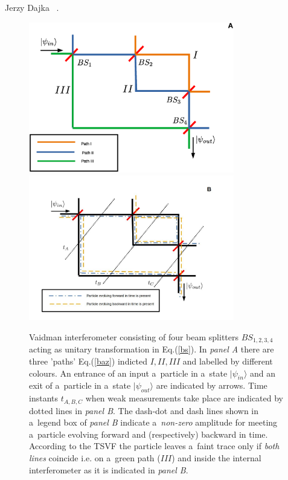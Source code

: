 \begin{artengenv}{Jerzy Dajka}
~\parencite{PhysRevA.95.032110,PhysRevA.97.046103,PhysRevA.97.046102,vaid_trans,lady}. 
\begin{figure}
\begin{center}
 \includegraphics[width=0.8\textwidth]{ART_dajka/vaid1a.eps}\\%
 \includegraphics[width=0.8\textwidth]{ART_dajka/vaid1b.jpg}%
\end{center}
 \caption{Vaidman  interferometer consisting of four beam splitters $BS_{1,2,3,4}$ acting as unitary transformation in Eq.(\ref{bs}). In  {\it panel A} there are  three 'paths' Eq.(\ref{baz}) indicted  $I,II,III$ and labelled by different colours. An entrance of an input a~particle in a~state $|\psi_{in}\rangle$ and an exit of a~particle in a~state $|\psi_{out}\rangle$ are indicated by arrows. Time instants  $t_{A,B,C}$ when  weak measurements take place are indicated by dotted lines in  {\it panel B}. The dash-dot and dash lines shown in a~legend box of {\it panel B} indicate  a~{\it non-zero} amplitude for meeting a~particle evolving forward and (respectively) backward in time. According to the TSVF the particle leaves a~faint trace only if {\it both lines} coincide i.e. on a~green path ($III$) and inside the internal interferometer as it is indicated in {\it panel B}.}\label{fig0}
\end{figure}


\end{artengenv}
